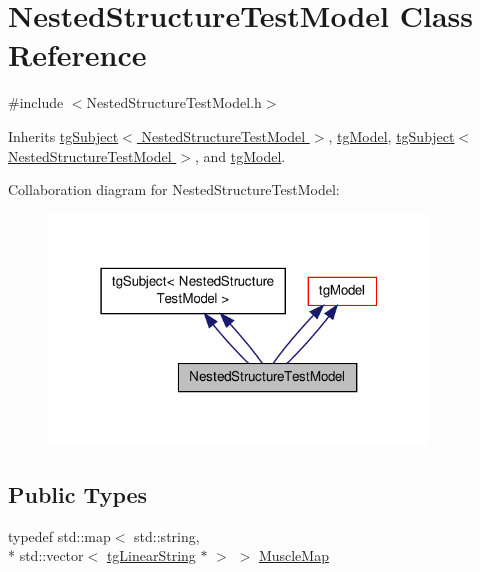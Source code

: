 \hypertarget{class_nested_structure_test_model}{\section{Nested\-Structure\-Test\-Model Class Reference}
\label{class_nested_structure_test_model}
}


{\ttfamily \#include $<$Nested\-Structure\-Test\-Model.\-h$>$}



Inherits \hyperlink{classtg_subject}{tg\-Subject$<$ Nested\-Structure\-Test\-Model $>$}, \hyperlink{classtg_model}{tg\-Model}, \hyperlink{classtg_subject}{tg\-Subject$<$ Nested\-Structure\-Test\-Model $>$}, and \hyperlink{classtg_model}{tg\-Model}.



Collaboration diagram for Nested\-Structure\-Test\-Model\-:\nopagebreak
\begin{figure}[H]
\begin{center}
\leavevmode
\includegraphics[width=286pt]{class_nested_structure_test_model__coll__graph}
\end{center}
\end{figure}
\subsection*{Public Types}
\begin{DoxyCompactItemize}
\item 
typedef std\-::map$<$ std\-::string, \\*
std\-::vector$<$ \hyperlink{classtg_linear_string}{tg\-Linear\-String} $\ast$ $>$ $>$ \hyperlink{class_nested_structure_test_model_a257809d15eeffe9f7defed730478a9b0}{Muscle\-Map}
\end{DoxyCompactItemize}
